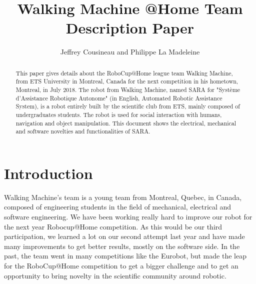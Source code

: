 \documentclass[runningheads,a4paper]{llncs}
\begin{document}
\newif\ifdraft
\draftfalse


\ifdraft
\setlength{\belowcaptionskip}{-5pt}
\fi

\title{Walking Machine @Home \newline {} Team Description Paper}

\author{Jeffrey Cousineau and Philippe La Madeleine}
\maketitle



\begin{abstract}

This paper gives details about the RoboCup@Home league team Walking Machine, from ETS University in Montreal, Canada for the next competition in his hometown, Montreal, in July 2018. The robot from Walking Machine, named SARA for "Système d’Assistance Robotique Autonome" (in English, Automated Robotic Assistance System), is a robot entirely built by the scientific club from ETS, mainly composed of undergraduates students. The robot is used for social interaction with humans, navigation and object manipulation. This document shows the electrical, mechanical and software novelties and functionalities of SARA.
\end{abstract}


\section{Introduction}
\tab Walking Machine’s team is a young team from Montreal, Quebec, in Canada, composed of engineering students in the field of mechanical, electrical and software engineering. We have been working really hard to improve our robot for the next year Robocup@Home competition. As this would be our third participation, we learned a lot on our second attempt last year and have made many improvements to get better results, mostly on the software side. In the past, the team went in many competitions like the Eurobot, but made the leap for the RoboCup@Home competition to get a bigger challenge and to get an opportunity to bring novelty in the scientific community around robotic. \\
\end{document}

